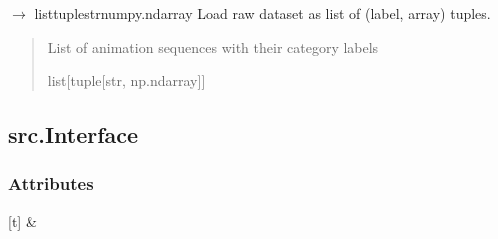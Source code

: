 \documentclass[letterpaper,10pt,english]{sphinxmanual}
\begin{document}

\begin{fulllineitems}
\label{\detokenize{autoapi/src/DataLoader/index:src.DataLoader.load_dataset}}
\pysigstartsignatures
\pysiglinewithargsret
{}
{}
{{ $\rightarrow$ list\DUrole{p}{{[}}tuple\DUrole{p}{{[}}strnumpy.ndarray\DUrole{p}{{]}}\DUrole{p}{{]}}}}
\pysigstopsignatures
\sphinxAtStartPar
Load raw dataset as list of (label, array) tuples.
\begin{quote}\begin{description}
\sphinxAtStartPar
List of animation sequences with their category labels

\sphinxAtStartPar
list{[}tuple{[}str, np.ndarray{]}{]}

\end{description}\end{quote}

\end{fulllineitems}


\sphinxstepscope


\subsection{src.Interface}
\label{\detokenize{autoapi/src/Interface/index:module-src.Interface}}\label{\detokenize{autoapi/src/Interface/index:src-interface}}\label{\detokenize{autoapi/src/Interface/index::doc}}

\subsubsection{Attributes}
\label{\detokenize{autoapi/src/Interface/index:attributes}}

\begin{savenotes}\sphinxattablestart
\sphinxthistablewithglobalstyle
\sphinxthistablewithnovlinesstyle
\centering
\begin{tabulary}{\linewidth}[t]{}
\sphinxtoprule
\sphinxtableatstartofbodyhook
\sphinxAtStartPar
{\hyperref[\detokenize{autoapi/src/Interface/index:src.Interface.interface}]{}}
&
\sphinxAtStartPar

\\
\sphinxbottomrule
\end{tabulary}
\sphinxtableafterendhook\par
\sphinxattableend\end{savenotes}
\end{document}
